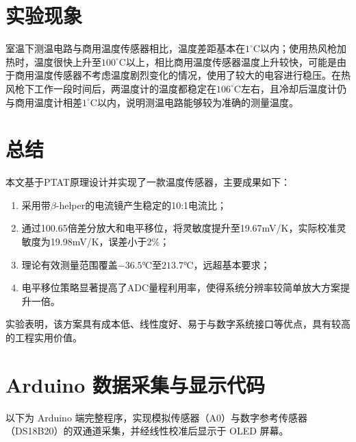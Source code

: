 \documentclass[12pt,a4paper]{article}
\begin{document}
\section{实验现象}

室温下测温电路与商用温度传感器相比，温度差距基本在$1^\circ$C以内；使用热风枪加热时，温度很快上升至$100^\circ$C以上，相比商用温度传感器温度上升较快，可能是由于商用温度传感器不考虑温度剧烈变化的情况，使用了较大的电容进行稳压。在热风枪下工作一段时间后，两温度计的温度都稳定在$106^\circ$C左右，且冷却后温度计仍与商用温度计相差$1^\circ$C以内，说明测温电路能够较为准确的测量温度。

\section{总结}
本文基于PTAT原理设计并实现了一款温度传感器，主要成果如下：
\begin{enumerate}
    \item 采用带$\beta$-helper的电流镜产生稳定的10:1电流比；
    \item 通过100.65倍差分放大和电平移位，将灵敏度提升至19.67mV/K，实际校准灵敏度为19.98mV/K，误差小于2\%；
    \item 理论有效测量范围覆盖$-36.5℃$至$213.7℃$，远超基本要求；
    \item 电平移位策略显著提高了ADC量程利用率，使得系统分辨率较简单放大方案提升一倍。
\end{enumerate}
实验表明，该方案具有成本低、线性度好、易于与数字系统接口等优点，具有较高的工程实用价值。


\appendix
\section{Arduino 数据采集与显示代码}

以下为 Arduino 端完整程序，实现模拟传感器（A0）与数字参考传感器（DS18B20）的双通道采集，并经线性校准后显示于 OLED 屏幕。
\end{document}
